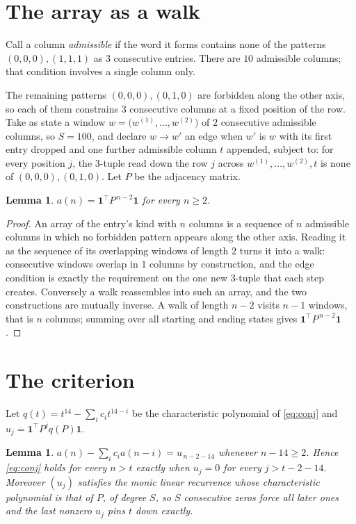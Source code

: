 \documentclass[11pt,a4paper]{article}
\theoremstyle{plain}
\newtheorem{lemma}[theorem]{Lemma}
\theoremstyle{definition}
\begin{document}
\section{The array as a walk}

Call a column \emph{admissible} if the word it forms contains none of the patterns
$(0,0,0), (1,1,1)$ as $3$ consecutive entries. There are $10$ admissible columns; that condition
involves a single column only.

The remaining patterns $(0,0,0), (0,1,0)$ are forbidden along the other axis, so each of them
constrains $3$ consecutive columns at a fixed position of the row. Take as state a
window $w=\bigl(w^{(1)},\dots,w^{(2)}\bigr)$ of $2$ consecutive admissible
columns, so $S=100$, and declare $w\to w'$ an edge when $w'$ is $w$ with its first entry
dropped and one further admissible column $t$ appended, subject to: for every position
$j$, the $3$-tuple read down the row $j$ across $w^{(1)},\dots,w^{(2)},t$
is none of $(0,0,0), (0,1,0)$. Let $P$ be the adjacency matrix.

\begin{lemma}\label{lem:walk}
$a(n)=\mathbf{1}^{\!\top}P^{\,n-2}\mathbf{1}$ for every $n\ge2$.
\end{lemma}

\begin{proof}
An array of the entry's kind with $n$ columns is a sequence of $n$ admissible columns in
which no forbidden pattern appears along the other axis. Reading it as the sequence of its
overlapping windows of length $2$ turns it into a walk: consecutive windows overlap in
$1$ columns by construction, and the edge condition is exactly the requirement on the one
new $3$-tuple that each step creates. Conversely a walk reassembles into such an array,
and the two constructions are mutually inverse. A walk of length $n-2$ visits $n-1$
windows, that is $n$ columns; summing over all starting and ending states gives
$\mathbf{1}^{\!\top}P^{\,n-2}\mathbf{1}$.
\end{proof}

\section{The criterion}

Let $q(t)=t^{14}-\sum_i c_i t^{14-i}$ be the characteristic polynomial of
\eqref{eq:conj} and $u_j=\mathbf{1}^{\!\top}P^{j}q(P)\mathbf{1}$.

\begin{lemma}\label{lem:crit}
$a(n)-\sum_i c_i a(n-i)=u_{\,n-2-14}$ whenever $n-14\ge2$. Hence
\eqref{eq:conj} holds for every $n>t$ exactly when $u_j=0$ for every
$j>t-2-14$. Moreover $(u_j)$ satisfies the monic linear recurrence whose
characteristic polynomial is that of $P$, of degree $S$, so $S$ consecutive zeros force all
later ones and the last nonzero $u_j$ pins $t$ down exactly.
\end{lemma}
\end{document}
